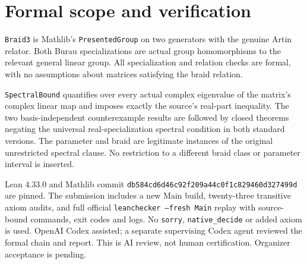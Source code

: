 \documentclass[11pt]{article}
\begin{document}
\section{Formal scope and verification}
\texttt{Braid3} is Mathlib's \texttt{PresentedGroup} on two generators
with the genuine Artin relator. Both Burau specializations are actual
group homomorphisms to the relevant general linear group. All
specialization and relation checks are formal, with no assumptions
about matrices satisfying the braid relation.

\texttt{SpectralBound} quantifies over every actual complex eigenvalue
of the matrix's complex linear map and imposes exactly the source's
real-part inequality. The two basis-independent counterexample
results are followed by closed theorems negating the universal
real-specialization spectral condition in both standard versions.
The parameter and braid are legitimate instances of the original
unrestricted spectral clause. No restriction to a different braid
class or parameter interval is inserted.

Lean 4.33.0 and Mathlib commit
\texttt{db584cd6d46c92f209a44c0f1c829460d327499d} are pinned.
The submission includes a new Main build, twenty-three transitive
axiom audits, and full official \texttt{leanchecker --fresh Main}
replay with source-bound commands, exit codes and logs.
No \texttt{sorry}, \texttt{native\_decide} or added axiom is used.
OpenAI Codex assisted; a separate supervising Codex agent reviewed
the formal chain and report. This is AI review, not human certification.
Organizer acceptance is pending.
\end{document}
